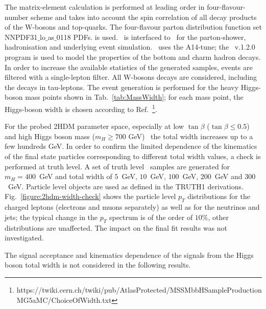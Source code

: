 The matrix-element calculation is performed at leading order in four-flavour-number scheme and takes into account the spin correlation of all decay products of the W-bosons and top-quarks. The four-flavour parton distribution function set NNPDF31$\_$lo$\_$as$\_$0118 PDFs. is used. \MadG\ is interfaced to \pythiaeight\ for the parton-shower, hadronisation and underlying event simulation. \pythiaeight\ uses the A14-tune; the \EvtGen\ v.1.2.0 program is used to model the properties of the bottom and charm hadron decays.  
In order to increase the available statistics of the generated samples, events are filtered with a single-lepton filter. 
All W-bosons decays are considered, including the decays in tau-leptons.
The event generation is performed for the heavy Higgs-boson mass points shown in Tab.~\ref{tab:MassWidth}; for each mass point, the Higgs-boson width is chosen according to Ref.~\footnote{https://twiki.cern.ch/twiki/pub/AtlasProtected/MSSMbbHSampleProductionMG5aMC/ChoiceOfWidth.txt}. 

For the probed 2HDM parameter space, especially at low $\tan\beta$ ($\tan\beta\leq 0.5$) and high 
Higgs boson mass ($m_{H}\geq 700$ GeV)~\cite{Orlando:2258130} the total width increases up to a few hundreds GeV. 
In order to confirm the limited dependence of the kinematics of the final state particles corresponding to different total width values, 
a check is performed at truth level. A set of truth level \ttH\ samples are generated for $m_{H}=400$~GeV and total width of 
$5$~GeV, $10$~GeV, $100$~GeV, $200$~GeV and $300$~GeV. Particle level objects are used as defined in the TRUTH1 derivations. 
Fig.~\ref{figure:2hdm-width-check} shows the particle level $p_{T}$ distributions for the charged leptons (electrons and muons separately) as well as for the neutrinos and
jets; the typical change in the $p_{T}$ spectrum is of the order of $10\%$, other distributions are unaffected. The impact on the final fit results was not investigated.

The signal acceptance and kinematics dependence of the signals from the Higgs boson total width is not considered in the following results. 

